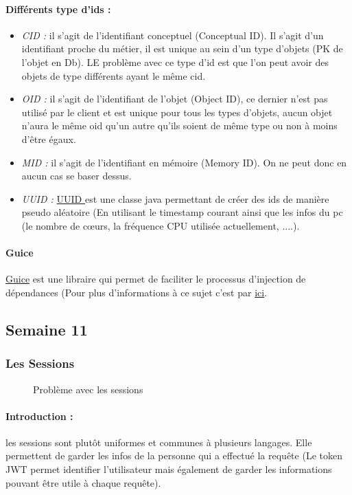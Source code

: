 \documentclass{article}[12pt]
\begin{document}
\paragraph{Différents type d'ids : }
\begin{itemize}
	\item \emph{CID : } il s'agit de l'identifiant conceptuel (Conceptual ID). Il s'agit d'un identifiant proche du métier, il est unique au sein d'un type d'objets (PK de l'objet en Db). LE problème avec ce type d'id est que l'on peut avoir des objets de type différents ayant le même cid.
    \item \emph{OID : } il s'agit de l'identifiant de l'objet (Object ID), ce dernier n'est pas utilisé par le client et est unique pour tous les types d'objets, aucun objet n'aura le même oid qu'un autre qu'ils soient de même type ou non à moins d'être égaux.
    \item  \emph{MID : } il s'agit de l'identifiant en mémoire (Memory ID). On ne peut donc en aucun cas se baser dessus.
    \item \emph{UUID : } \href{https://docs.oracle.com/javase/7/docs/api/java/util/UUID.html}{UUID } est une classe java permettant de créer des ids de manière pseudo aléatoire (En utilisant le timestamp courant ainsi que les infos du pc (le nombre de cœurs, la fréquence CPU utilisée actuellement, ....). 
\end{itemize}
\paragraph{Guice} \href{https://github.com/google/guice}{Guice} est une libraire qui permet de faciliter le processus d'injection de dépendances (Pour plus d'informations à ce sujet c'est par \href{https://github.com/google/guice}{ici}.
\subsection{Semaine 11}
\subsubsection{Les Sessions}
\begin{figure}[H]
    \centering
    \caption{Problème avec les sessions}
\end{figure}
\paragraph{Introduction : } les sessions sont plutôt uniformes et communes à plusieurs langages. Elle permettent de garder les infos de la personne qui a effectué la requête (Le token JWT permet identifier l'utilisateur mais également de garder les informations pouvant être utile à chaque requête).
\end{document}
